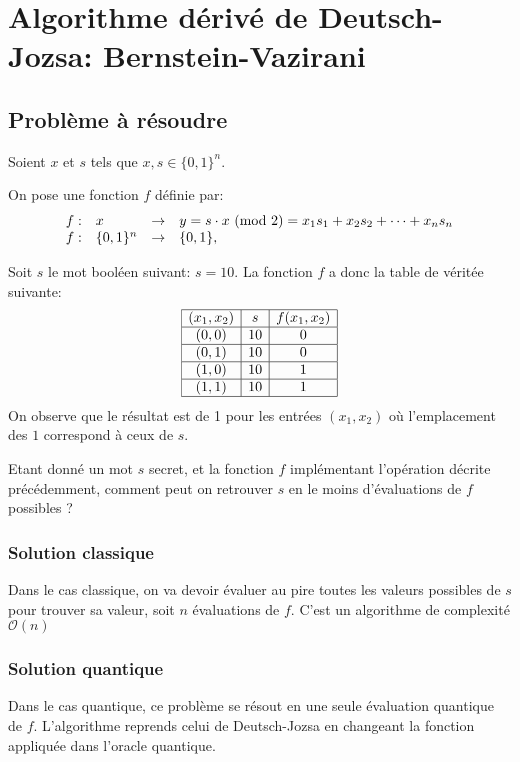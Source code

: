 \chapter{Algorithme dérivé de Deutsch-Jozsa: Bernstein-Vazirani}
\section{Problème à résoudre}

Soient $x$ et $s$ tels que $x, s \in \{0, 1\}^n$.

On pose une fonction $f$ définie par:
\[
  \begin{array}{llll}
    f :  &  x              & \to     & y = s \cdot x \ (\mathrm{mod}\ 2) = x_1 s_1 + x_2 s_2 + \dots + x_n s_n \\
    f:   &  \{0, 1\}^n     & \to     & \{0, 1\},
  \end{array}  
\]

\begin{ex}
  Soit $s$ le mot booléen suivant: $s = 10$. La fonction $f$ a donc la table de véritée suivante:
\[
  \begin{array}{|c|c|c|}
    \hline
   (x_1, x_2) & s & f(x_1,x_2) \\
    \hline
    (0,0) & 10 & 0 \\
    \hline
    (0,1) & 10 & 0 \\
    \hline
    (1,0) & 10 & 1 \\
    \hline
    (1,1) & 10 & 1 \\
    \hline
  \end{array}
\]
On observe que le résultat est de 1 pour les entrées $(x_1, x_2)$ où l'emplacement des $1$ correspond à ceux de $s$.
\end{ex}

\begin{pb}
Etant donné un mot $s$ secret, et la fonction $f$ implémentant l'opération décrite précédemment, comment peut on retrouver $s$ en le moins d'évaluations de $f$ possibles ?
\end{pb}

\subsection{Solution classique}
Dans le cas classique, on va devoir évaluer au pire toutes les valeurs possibles de $s$ pour trouver sa valeur, soit $n$ évaluations de $f$. C'est un algorithme de complexité $\mathcal{O}(n)$

\subsection{Solution quantique}
Dans le cas quantique, ce problème se résout en une seule évaluation
quantique de $f$. L'algorithme reprends celui de Deutsch-Jozsa en changeant la fonction appliquée dans l'oracle quantique.

